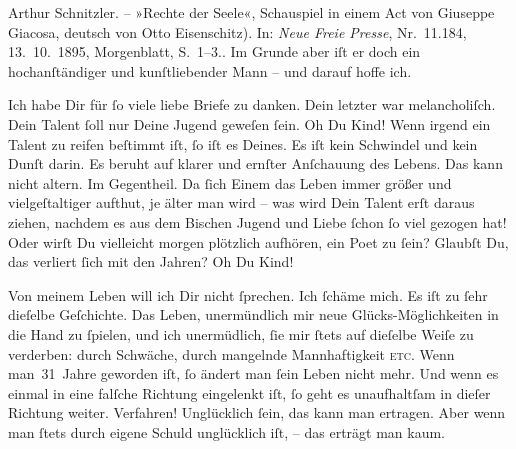 {{{{                        Arthur Schnitzler. – »Rechte der Seele«, Schauspiel in einem Act von
                        Giuseppe Giacosa, deutsch von Otto Eisenschitz)}. In: \emph{Neue Freie Presse}, Nr. 11.184, 13. 10. 1895, Morgenblatt, S. 1–3.}}}\label{K_L02762-8}. Im Grunde {\pb}aber iſt er doch ein hochanſtändiger und
               kunſtliebender Mann – und darauf hoffe ich.\pend
           
\pstart
           Ich habe Dir für ſo viele liebe Briefe zu danken. Dein letzter war melancholiſch.
               Dein Talent ſoll nur Deine Jugend geweſen ſein. Oh Du Kind! Wenn irgend ein Talent zu
               reifen beſtimmt iſt, ſo iſt es Deines. Es iſt kein Schwindel und kein Dunſt darin. Es
               beruht auf klarer {\pb}und  ernſter Anſchauung des Lebens.  Das
               kann nicht altern. Im Gegentheil. Da ſich Einem das Leben immer größer und
               vielgeſtaltiger aufthut, je älter man wird – was wird Dein Talent erſt daraus ziehen,
                   nachdem es aus dem Bischen Jugend und Liebe
               ſchon ſo viel gezogen hat! Oder wirſt Du vielleicht morgen plötzlich {\pb}aufhören, ein Poet zu ſein? Glaubſt Du, das verliert
               ſich mit den Jahren? Oh Du Kind! {\dotsfive}\pend
           
\pstart
           Von meinem Leben will ich Dir nicht ſprechen. Ich ſchäme mich. Es iſt zu ſehr
               dieſelbe Geſchichte. Das Leben, unermündlich mir 
               neue Glücks-Möglichkeiten in die Hand zu ſpielen, und {\pb}ich unermüdlich, ſie mir ſtets auf dieſelbe Weiſe zu
               verderben: durch Schwäche, durch mangelnde Mannhaftigkeit \textsc{etc}. Wenn man 31 Jahre geworden iſt, ſo ändert man ſein Leben nicht mehr.
               Und wenn es einmal in eine falſche Richtung eingelenkt iſt, ſo geht es unaufhaltſam
               in dieſer Richtung weiter. Verfahren! Unglücklich ſein, das kann man {\pb}ertragen. Aber wenn man ſtets durch eigene Schuld
               unglücklich iſt, – das erträgt man kaum.\pend
           
